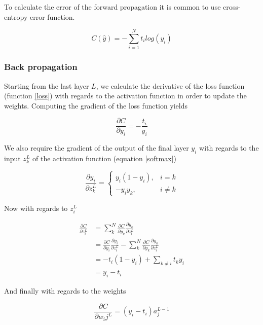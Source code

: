 \documentclass[thesis.tex]{subfiles}
\begin{document}
To calculate the error of the forward propagation it is common to use cross-entropy error function.

\begin{equation} %
  C(\hat{y}) = - \sum_{i=1}^N t_i log(y_i)
  \label{loss}
\end{equation}


\subsubsection{Back propagation}
Starting from the last layer $L$, we calculate the derivative of the loss function (function \ref{loss}) with regards to the activation function in order to update the weights. Computing the gradient of the loss function yields

\begin{equation}
  \frac{\partial C}{\partial y_i} = - \frac{t_i}{y_i}
\end{equation}

We also require the gradient of the output of the final layer $y_i$ with regards to the input $z_k^L$ of the activation function (equation \ref{softmax})

\begin{equation}
  \frac{\partial y_i}{\partial z_k^L} = 
  \begin{cases}
      y_i(1 - y_i), & i = k\\
      -y_iy_k, & i \ne k
  \end{cases}
\end{equation}

Now with regards to $z_i^L$

\begin{equation}
  \begin{aligned}
  \frac{\partial C}{\partial z_i^L} &= \sum_k^N \frac{\partial C}{\partial y_k}\frac{\partial y_k}{\partial z_i^L} \\
  &= \frac{\partial C}{\partial y_i}\frac{\partial y_i}{\partial z_i^L} - \sum_k^N \frac{\partial C}{\partial y_k}\frac{\partial y_k}{\partial z_i^L} \\
  &= -t_i(1 - y_i) + \sum_{k \ne i}t_ky_i \\
  &= y_i - t_i
  \end{aligned}
\end{equation}

And finally with regards to the weights

\begin{equation}
   \frac{\partial C}{\partial w_ij^L} = (y_i - t_i)a_j^{L-1}
\end{equation}
\end{document}
